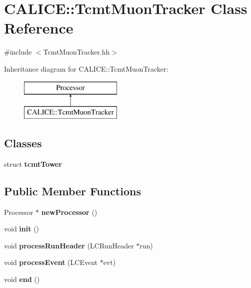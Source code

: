 \section{C\-A\-L\-I\-C\-E\-:\-:Tcmt\-Muon\-Tracker Class Reference}
\label{classCALICE_1_1TcmtMuonTracker}


{\ttfamily \#include $<$Tcmt\-Muon\-Tracker.\-hh$>$}

Inheritance diagram for C\-A\-L\-I\-C\-E\-:\-:Tcmt\-Muon\-Tracker\-:\begin{figure}[H]
\begin{center}
\leavevmode
\includegraphics[height=2.000000cm]{classCALICE_1_1TcmtMuonTracker}
\end{center}
\end{figure}
\subsection*{Classes}
\begin{DoxyCompactItemize}
\item 
struct {\bf tcmt\-Tower}
\end{DoxyCompactItemize}
\subsection*{Public Member Functions}
\begin{DoxyCompactItemize}
\item 
Processor $\ast$ {\bfseries new\-Processor} ()\label{classCALICE_1_1TcmtMuonTracker_a128370dc29c7099de47c9735047ffb35}

\item 
void {\bf init} ()
\item 
void {\bf process\-Run\-Header} (L\-C\-Run\-Header $\ast$run)
\item 
void {\bf process\-Event} (L\-C\-Event $\ast$evt)
\item 
void {\bfseries end} ()\label{classCALICE_1_1TcmtMuonTracker_aaa57745b64b3b04cc6b45a5a3dc1f19e}

\end{DoxyCompactItemize}
